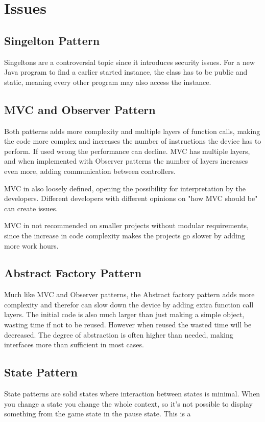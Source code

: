 \chapter{Issues}
\section{Singelton Pattern}
	Singeltons are a controversial topic since it introduces security issues. For a new Java program to find a earlier started instance, the class has to be public and static, meaning every other program may also access the instance. 

\section{MVC and Observer Pattern}
	Both patterns adds more complexity and multiple layers of function calls, making the code more complex and increases the number of instructions the device has to perform. If used wrong the performance can decline. MVC has multiple layers, and when implemented with Observer patterns the number of layers increases even more, adding communication between controllers.

	MVC in also loosely defined, opening the possibility for interpretation by the developers. Different developers with different opinions on "how MVC should be" can create issues.

	MVC in not recommended on smaller projects without modular requirements, since the increase in code complexity makes the projects go slower by adding more work hours.

\section{Abstract Factory Pattern}
	Much like MVC and Observer patterns, the Abstract factory pattern adds more complexity and therefor can slow down the device by adding extra function call layers. The initial code is also much larger than just making a simple object, wasting time if not to be reused. However when reused the wasted time will be decreased.
	The degree of abstraction is often higher than needed, making interfaces more than sufficient in most cases.

\section{State Pattern}
	State patterns are solid states where interaction between states is minimal. When you change a state you change the whole context, so it's not possible to display something from the game state in the pause state. This is a 
